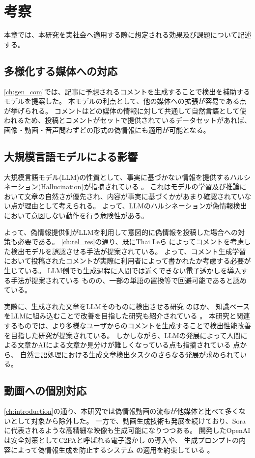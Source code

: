 \chapter{考察}
\label{ch:discussion}
本章では、本研究を実社会へ適用する際に想定される効果及び課題について記述する。

\section{多様化する媒体への対応}
\cref{ch:gen_com}では、記事に予想されるコメントを生成することで検出を補助するモデルを提案した。
本モデルの利点として、他の媒体への拡張が容易である点が挙げられる。
コメントはどの媒体の情報に対して共通して自然言語として使われるため、投稿とコメントがセットで提供されているデータセットがあれば、画像・動画・音声問わずどの形式の偽情報にも適用が可能となる。

\section{大規模言語モデルによる影響}
大規模言語モデル(LLM)の性質として、事実に基づかない情報を提供するハルシネーション(Hallucination)が指摘されている \cite{Alkaissi2023-bo}。
これはモデルの学習及び推論において文章の自然さが優先され、内容が事実に基づくかがあまり確認されていない点が理由として考えられる。
よって、LLMのハルシネーションが偽情報検出において意図しない動作を行う危険性がある。

よって、偽情報提供側がLLMを利用して意図的に偽情報を投稿した場合への対策も必要である。
\cref{ch:rel_res}の通り、既にThai Leら \cite{9338282}によってコメントを考慮した検出モデルを誤認させる手法が提案されている。
よって、コメント生成学習において投稿されたコメントが実際に利用者によって書かれたか考慮する必要が生じている。
LLM側でも生成過程に人間では近くできない電子透かしを導入する手法が提案されている \cite{Dathathri2024}ものの、一部の単語の置換等で回避可能であると認めている。

実際に、生成された文章をLLMそのものに検出させる研究 \cite{10.1145/3655103.3655106} のほか、
知識ベースをLLMに組み込むことで改善を目指した研究も紹介されている \cite{10.1145/3512467}。
本研究と関連するものでは、より多様なユーザからのコメントを生成することで検出性能改善を目指した研究が提案されている\cite{10.1145/3627673.3679519}。
しかしながら、LLMの発展によって人間による文章かAIによる文章か見分けが難しくなっている点も指摘されている \cite{Elkhatat2023,chen2023can}点から、
自然言語処理における生成文章検出タスクのさらなる発展が求められている。


\section{動画への個別対応}
\cref{ch:introduction}の通り、本研究では偽情報動画の流布が他媒体と比べて多くないとして対象から除外した。
一方で、動画生成技術も発展を続けており、Sora \cite{videoworldsimulators2024}に代表されるような高精細な映像も生成可能になりつつある。
開発したOpenAIは安全対策としてC2PAと呼ばれる電子透かし \cite{C2PA}の導入や、
生成プロンプトの内容によって偽情報生成を防止するシステム \cite{AI_2023}の適用を約束している \cite{AI_2024}。

